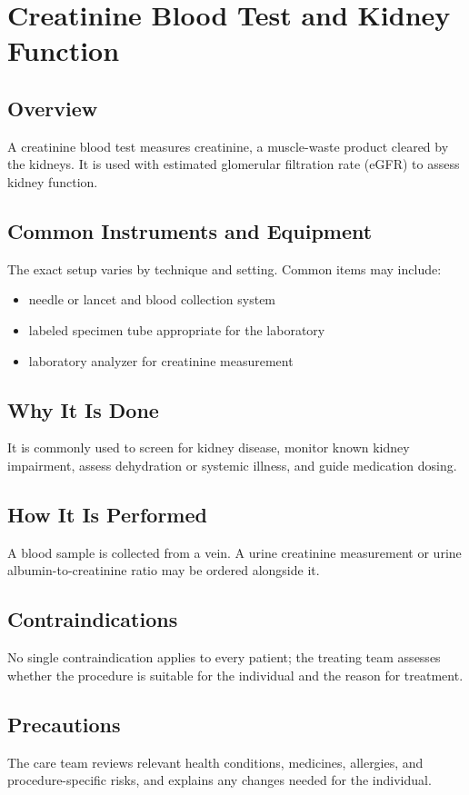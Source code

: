 \chapter{Creatinine Blood Test and Kidney Function}

\section*{Overview}
A creatinine blood test measures creatinine, a muscle-waste product cleared by the kidneys. It is used with estimated glomerular filtration rate (eGFR) to assess kidney function.

\section*{Common Instruments and Equipment}
The exact setup varies by technique and setting. Common items may include:
\begin{itemize}[nosep,leftmargin=*]
  \item needle or lancet and blood collection system
  \item labeled specimen tube appropriate for the laboratory
  \item laboratory analyzer for creatinine measurement
\end{itemize}

\section*{Why It Is Done}
It is commonly used to screen for kidney disease, monitor known kidney impairment, assess dehydration or systemic illness, and guide medication dosing.

\section*{How It Is Performed}
A blood sample is collected from a vein. A urine creatinine measurement or urine albumin-to-creatinine ratio may be ordered alongside it.

\section*{Contraindications}
No single contraindication applies to every patient; the treating team assesses whether the procedure is suitable for the individual and the reason for treatment.

\section*{Precautions}
The care team reviews relevant health conditions, medicines, allergies, and procedure-specific risks, and explains any changes needed for the individual.

